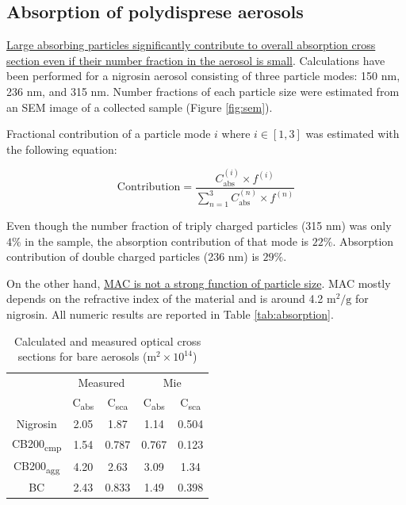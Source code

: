 \documentclass[12pt]{article}
\begin{document}
\subsection*{Absorption of polydisprese aerosols}

\ul{Large absorbing particles significantly contribute to overall absorption cross section even if their number fraction in the aerosol is small}. Calculations have been performed for a nigrosin aerosol consisting of three particle modes: 150 nm, 236 nm, and 315 nm. Number fractions of each particle size were estimated from an SEM image of a collected sample (Figure \ref{fig:sem}).

Fractional contribution of a particle mode $i$ where $i\in [1,3]$ was estimated with the following equation:

\begin{equation}
    \mathrm{Contribution}=\frac{C_\mathrm{abs}^{(i)}\times f^{(i)}}{\sum_{n=1}^3{C_\mathrm{abs}^{(n)}\times f^{(n)}}}
\end{equation}

Even though the number fraction of triply charged particles (315 nm) was only $4\%$ in the sample, the absorption contribution of that mode is $22\%$. Absorption contribution of double charged particles (236 nm) is $29\%$.

On the other hand, \ul{MAC is not a strong function of particle size}. MAC mostly depends on the refractive index of the material and is around 4.2 $\mathrm{m}^2/\mathrm{g}$ for nigrosin. All numeric results are reported in Table \ref{tab:absorption}.

\newpage

\begin{table}[!h]
\centering
\caption{Calculated and measured optical cross sections for bare aerosols ($\mathrm{m}^2\times10^{14}$)}
\begin{tabular}{c c c c c}
    \hline
     & \multicolumn{2}{c}{Measured} & \multicolumn{2}{c}{Mie} \\
     & C\textsubscript{abs} & C\textsubscript{sca} & C\textsubscript{abs} & C\textsubscript{sca} \\
     \hline
     Nigrosin & 2.05 & 1.87 & 1.14 & 0.504 \\
     CB200\textsubscript{cmp} & 1.54 & 0.787 & 0.767 & 0.123 \\
     CB200\textsubscript{agg} & 4.20 & 2.63 & 3.09 & 1.34 \\
     BC & 2.43 & 0.833 & 1.49 & 0.398 \\
     \hline
\end{tabular}
\label{tab:absolute}
\end{table}
\end{document}
